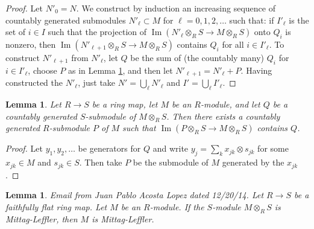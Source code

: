 \documentclass{amsart}
\newenvironment{reference}{\comment}{\endcomment}
\theoremstyle{plain}
\newtheorem{lemma}[subsection]{Lemma}
\theoremstyle{definition}
\theoremstyle{remark}
\numberwithin{equation}{subsection}
\def\Im{\mathop{\mathrm{Im}}}
\begin{document}
\begin{proof}
Let $N'_0 = N$.  We construct by induction an increasing sequence of countably
generated submodules $N'_{\ell} \subset M$ for $\ell = 0, 1, 2, \ldots$
such that: if $I'_{\ell}$ is the set of $i \in I$ such that the projection of
$\Im(N'_{\ell} \otimes_R S \to M \otimes_R S)$ onto $Q_i$ is
nonzero, then $\Im(N'_{\ell + 1} \otimes_R S \to M \otimes_R
S)$ contains $Q_i$ for all $i \in I'_{\ell}$.  To construct $N'_{\ell + 1}$
from $N'_\ell$, let $Q$ be the sum of (the countably many) $Q_i$ for
$i \in I'_{\ell}$, choose $P$ as in Lemma
\ref{algebra-lemma-lift-countably-generated-submodule}, and then let $N'_{\ell + 1} =
N'_{\ell} + P$.  Having constructed the $N'_{\ell}$, just take $N' =
\bigcup_{\ell} N'_{\ell}$ and $I' = \bigcup_{\ell} I'_{\ell}$.
\end{proof}


\begin{lemma}
\label{algebra-lemma-lift-countably-generated-submodule}
Let $R \to S$ be a ring map, let $M$ be an $R$-module, and let $Q$ be a
countably generated $S$-submodule of $M \otimes_R S$.  Then there exists a
countably generated $R$-submodule $P$ of $M$ such that
$\Im(P \otimes_R S \to M \otimes_R S)$ contains $Q$.
\end{lemma}

\begin{proof}
Let $y_1, y_2, \ldots$ be generators for $Q$ and write $y_j = \sum_k x_{jk}
\otimes s_{jk}$ for some $x_{jk} \in M$ and $s_{jk} \in S$. Then take $P$ be
the submodule of $M$ generated by the $x_{jk}$.
\end{proof}


\begin{lemma}
\label{algebra-lemma-ffdescent-ML}
\begin{reference}
Email from Juan Pablo Acosta Lopez dated 12/20/14.
\end{reference}
Let $R \to S$ be a faithfully flat ring map. Let $M$ be an $R$-module. If the
$S$-module $M \otimes_R S$ is Mittag-Leffler, then $M$ is Mittag-Leffler.
\end{lemma}
\end{document}
